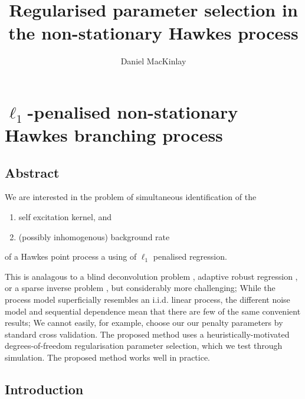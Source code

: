 \documentclass[11pt]{article}
\title{Regularised parameter selection in the non-stationary Hawkes process}
\author{Daniel MacKinlay}
\providecommand{\tightlist}{%
      \setlength{\itemsep}{0pt}\setlength{\parskip}{0pt}}
\begin{document}
    
    
    \maketitle
    
    

    
    \section{\texorpdfstring{\(\ell_1\)-penalised non-stationary Hawkes
branching
process}{\textbackslash{}ell\_1-penalised non-stationary Hawkes branching process}}\label{ell_1-penalised-non-stationary-hawkes-branching-process}





    \subsection{Abstract}\label{abstract}

We are interested in the problem of simultaneous identification of the

\begin{enumerate}
\def\labelenumi{\arabic{enumi}.}
\tightlist
\item
  self excitation kernel, and
\item
  (possibly inhomogenous) background rate
\end{enumerate}

of a Hawkes point process a using of \(\ell_1\) penalised regression.

This is analagous to a blind deconvolution problem
\cite{stockham_blind_1975}, adaptive robust regression
\cite{donoho_automatic_1988}, or a sparse inverse problem
\cite{tibshirani_regression_1996}, but considerably more challenging;
While the process model superficially resembles an i.i.d. linear
process, the different noise model and sequential dependence mean that
there are few of the same convenient results; We cannot easily, for
example, choose our our penalty parameters by standard cross validation.
The proposed method uses a heuristically-motivated degrees-of-freedom
regularisation parameter selection, which we test through simulation.
The proposed method works well in practice.

    \subsection{Introduction}\label{introduction}
\end{document}
